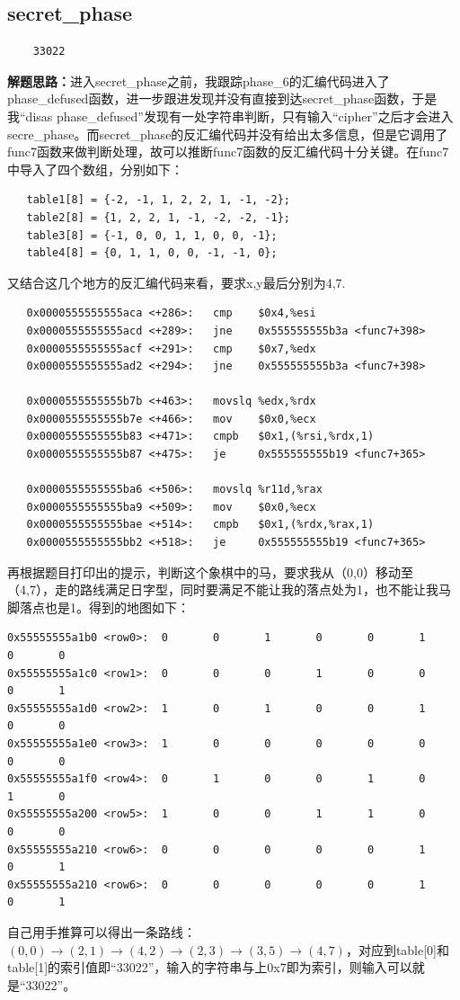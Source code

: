 \documentclass{article}
\begin{document}
\subsection{secret\_phase}
\begin{verbatim}
    33022
\end{verbatim}
\textbf{解题思路：}进入secret\_phase之前，我跟踪phase\_6的汇编代码进入了phase\_defused函数，进一步跟进发现并没有直接到达secret\_phase函数，于是我“disas phase\_defused”发现有一处字符串判断，只有输入“cipher”之后才会进入secre\_phase。而secret\_phase的反汇编代码并没有给出太多信息，但是它调用了func7函数来做判断处理，故可以推断func7函数的反汇编代码十分关键。在func7中导入了四个数组，分别如下：
\begin{verbatim}
   table1[8] = {-2, -1, 1, 2, 2, 1, -1, -2};
   table2[8] = {1, 2, 2, 1, -1, -2, -2, -1};
   table3[8] = {-1, 0, 0, 1, 1, 0, 0, -1};
   table4[8] = {0, 1, 1, 0, 0, -1, -1, 0};
\end{verbatim}
又结合这几个地方的反汇编代码来看，要求x,y最后分别为4,7.
\begin{verbatim}
   0x0000555555555aca <+286>:   cmp    $0x4,%esi
   0x0000555555555acd <+289>:   jne    0x555555555b3a <func7+398>
   0x0000555555555acf <+291>:   cmp    $0x7,%edx
   0x0000555555555ad2 <+294>:   jne    0x555555555b3a <func7+398>

   0x0000555555555b7b <+463>:   movslq %edx,%rdx
   0x0000555555555b7e <+466>:   mov    $0x0,%ecx
   0x0000555555555b83 <+471>:   cmpb   $0x1,(%rsi,%rdx,1)
   0x0000555555555b87 <+475>:   je     0x555555555b19 <func7+365>
   
   0x0000555555555ba6 <+506>:   movslq %r11d,%rax
   0x0000555555555ba9 <+509>:   mov    $0x0,%ecx
   0x0000555555555bae <+514>:   cmpb   $0x1,(%rdx,%rax,1)
   0x0000555555555bb2 <+518>:   je     0x555555555b19 <func7+365>
\end{verbatim}
再根据题目打印出的提示，判断这个象棋中的马，要求我从（0,0）移动至（4,7），走的路线满足日字型，同时要满足不能让我的落点处为1，也不能让我马脚落点也是1。得到的地图如下：
\begin{verbatim}
0x55555555a1b0 <row0>:  0       0       1       0       0       1       0       0 
0x55555555a1c0 <row1>:  0       0       0       1       0       0       0       1 
0x55555555a1d0 <row2>:  1       0       1       0       0       1       0       0 
0x55555555a1e0 <row3>:  1       0       0       0       0       0       0       0 
0x55555555a1f0 <row4>:  0       1       0       0       1       0       1       0 
0x55555555a200 <row5>:  1       0       0       1       1       0       0       0 
0x55555555a210 <row6>:  0       0       0       0       0       1       0       1 
0x55555555a210 <row6>:  0       0       0       0       0       1       0       1 
\end{verbatim}
自己用手推算可以得出一条路线：$(0,0)\to(2,1)\to(4,2)\to(2,3)\to(3,5)\to(4,7)$，对应到table[0]和table[1]的索引值即“33022”，输入的字符串与上0x7即为索引，则输入可以就是“33022”。
\end{document}
